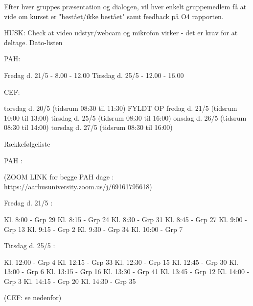 Efter hver gruppes præsentation og dialogen, vil hver enkelt gruppemedlem få at vide om kurset er "bestået/ikke bestået" samt feedback på O4 rapporten.

HUSK: Check at video udstyr/webcam og mikrofon virker - det er krav for at deltage.
Dato-listen

PAH:

    Fredag d. 21/5 - 8.00 - 12.00
    Tirsdag d. 25/5 - 12.00 - 16.00

CEF:

    torsdag d. 20/5   (tidsrum 08:30 til 11:30) FYLDT OP
    fredag d. 21/5      (tidsrum 10:00 til 13:00)
    tirsdag d. 25/5    (tidsrum 08:30 til 16:00)
    onsdag d. 26/5    (tidsrum 08:30 til 14:00)
    torsdag d. 27/5   (tidsrum 08:30 til 16:00)

Rækkefølgeliste

PAH :

(ZOOM LINK for begge PAH dage :  https://aarhusuniversity.zoom.us/j/69161795618)

Fredag d. 21/5 :

    Kl. 8:00 - Grp 29
    Kl. 8:15 - Grp 24
    Kl. 8:30 - Grp 31
    Kl. 8:45 - Grp 27
    Kl. 9:00 - Grp 13
    Kl. 9:15 - Grp 2
    Kl. 9:30 - Grp 34
    Kl. 10:00 - Grp 7

Tirsdag d. 25/5 :

    Kl. 12:00 - Grp 4
    Kl. 12:15 - Grp 33
    Kl. 12:30 - Grp 15
    Kl. 12:45 - Grp 30
    Kl. 13:00 - Grp 6
    Kl. 13:15 - Grp 16
    Kl. 13:30 - Grp 41
    Kl. 13:45 - Grp 12
    Kl. 14:00 - Grp 3
    Kl. 14:15 - Grp 20
    Kl. 14:30 - Grp 35

(CEF: se nedenfor)
